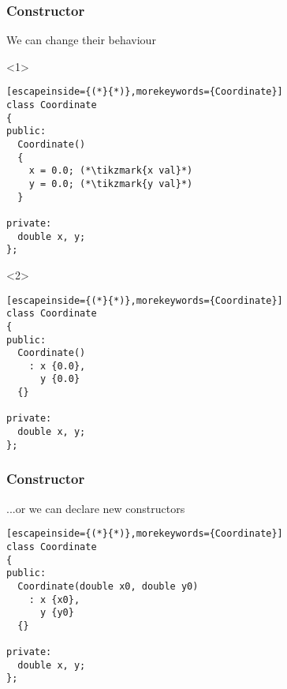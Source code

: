 \documentclass[14pt,a4paper,dvipsnames,usenames]{beamer}
\begin{document}
\begin{frame}[fragile]
  \frametitle{Constructor}

  We can change their behaviour

  \begin{overlayarea}{\textwidth}{6cm}
    \begin{onlyenv}<1>
  \begin{lstlisting}[escapeinside={(*}{*)},morekeywords={Coordinate}]
class Coordinate
{
public:
  Coordinate()
  {
    x = 0.0; (*\tikzmark{x val}*)
    y = 0.0; (*\tikzmark{y val}*)
  }

private:
  double x, y;
};
  \end{lstlisting}

  \nointerlineskip

    \end{onlyenv}

    \begin{onlyenv}<2>
  \begin{lstlisting}[escapeinside={(*}{*)},morekeywords={Coordinate}]
class Coordinate
{
public:
  Coordinate()
    : x {0.0},
      y {0.0}
  {}

private:
  double x, y;
};
  \end{lstlisting}
    \end{onlyenv}
  \end{overlayarea}

\end{frame}

\begin{frame}[fragile]
  \frametitle{Constructor}

  ...or we can declare new constructors

  \vspace{.3em}
  \begin{lstlisting}[escapeinside={(*}{*)},morekeywords={Coordinate}]
class Coordinate
{
public:
  Coordinate(double x0, double y0)
    : x {x0},
      y {y0}
  {}

private:
  double x, y;
};
  \end{lstlisting}


  \vspace{.3em}

\end{frame}
\end{document}
